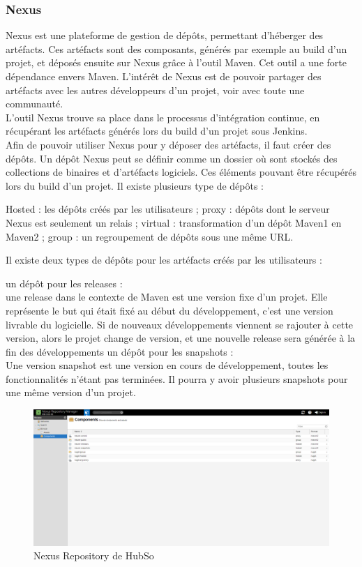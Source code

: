 \subsubsection{Nexus}
Nexus est une plateforme de gestion de dépôts, permettant d'héberger des artéfacts. Ces artéfacts sont des composants, générés par exemple au build d'un projet, et déposés ensuite sur Nexus grâce à l'outil Maven. Cet outil a une forte dépendance envers Maven. L'intérêt de Nexus est de pouvoir partager des artéfacts avec les autres développeurs d'un projet, voir avec toute une communauté.\\
L'outil Nexus trouve sa place dans le processus d'intégration continue, en récupérant les artéfacts générés lors du build d'un projet sous Jenkins.  \\
Afin de pouvoir utiliser Nexus pour y déposer des artéfacts, il faut créer des dépôts. Un dépôt Nexus peut se définir comme un dossier où sont stockés des collections de binaires et d'artéfacts logiciels. Ces éléments pouvant être récupérés lors du build d'un projet. Il existe plusieurs type de dépôts :
\begin{itemize}
	\itemcheck Hosted : les dépôts créés par les utilisateurs ;
	\itemcheck proxy : dépôts dont le serveur Nexus est seulement un relais ;
	\itemcheck virtual : transformation d'un dépôt Maven1 en Maven2 ;
	\itemcheck group : un regroupement de dépôts sous une même URL.
\end{itemize}
Il existe deux types de dépôts pour les artéfacts créés par les utilisateurs :
\begin{itemize}
	\itemcheck un dépôt pour les releases : \\
	une release dans le contexte de Maven est une version fixe d'un projet. Elle représente le but qui était fixé au début du développement, c'est une version livrable du logicielle. Si de nouveaux développements viennent se rajouter à cette version, alors le projet change de version, et une nouvelle release sera générée à la fin des développements
	\itemcheck un dépôt pour les snapshots : \\
	Une version snapshot est une version en cours de développement, toutes les fonctionnalités n'étant pas terminées. Il pourra y avoir plusieurs snapshots pour une même version d'un projet.
\end{itemize}
\begin{figure}[H]
	\centering
	\begin{minipage}{12cm}
		\centering
		\includegraphics[width=1\textwidth]{fig/nexus.png}
	\end{minipage}
	\caption{Nexus Repository de HubSo}
	\label{fig:vdfdf}
\end{figure}
